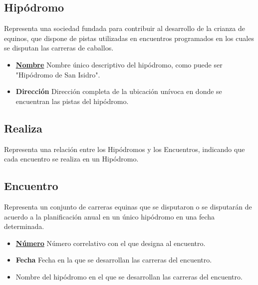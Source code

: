 \documentclass[a4paper,11pt]{article}
\begin{document}
\subsection{Hipódromo}

Representa una sociedad fundada para contribuir al desarrollo de la crianza de
equinos, que dispone de pistas utilizadas en encuentros programados en los
cuales se disputan las carreras de caballos.

\begin{itemize}

  \item \textbf{\uline{Nombre}} Nombre único descriptivo del hipódromo, como
    puede ser "Hipódromo de San Isidro".

  \item \textbf{Dirección} Dirección completa de la ubicación unívoca en donde
    se encuentran las pistas del hipódromo.

\end{itemize}

\subsection{Realiza}

Representa una relación entre los Hipódromos y los Encuentros, indicando que cada
encuentro se realiza en un Hipódromo. 

\subsection{Encuentro}

Representa un conjunto de carreras equinas que se disputaron o se disputarán de
acuerdo a la planificación anual en un único hipódromo en una fecha
determinada.

\begin{itemize}

  \item \textbf{\uline{Número}} Número correlativo con el que designa al
    encuentro.

  \item \textbf{Fecha} Fecha en la que se desarrollan las carreras del
    encuentro.

  \item \textbf{} Nombre del hipódromo en el que se
    desarrollan las carreras del encuentro.

\end{itemize}
\end{document}
